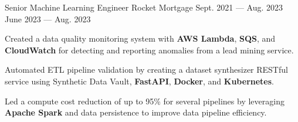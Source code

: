 
\vspace{-0.2cm}
\begin{cventries}
  \cventry
    {Senior Machine Learning Engineer} %
    {Rocket Mortgage} %
    {Sept. 2021 --- Aug. 2023} %
    {June 2023 --- Aug. 2023} %
    {
      \vspace{-0.1cm}
      \begin{cvitems} %
        \item Created a data quality monitoring system with \textbf{AWS Lambda}, \textbf{SQS}, and \textbf{CloudWatch} for detecting and reporting anomalies from a lead mining service.
        \item Automated ETL pipeline validation by creating a dataset synthesizer RESTful service using Synthetic Data Vault, \textbf{FastAPI}, \textbf{Docker}, and \textbf{Kubernetes}.
        \item Led a compute cost reduction of up to 95\% for several pipelines by leveraging \textbf{Apache Spark} and data persistence to improve data pipeline efficiency.
      \end{cvitems}
    }
  \vspace{-.2cm}


\end{cventries}
